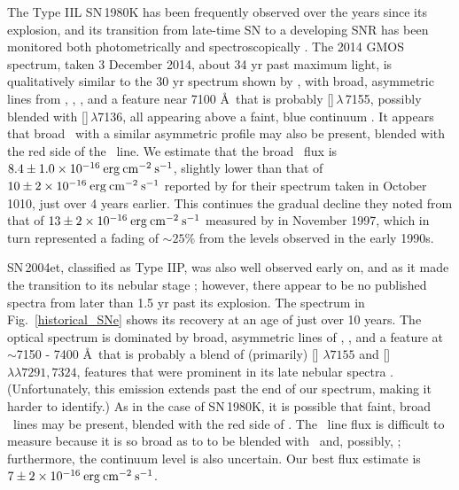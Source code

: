 The Type IIL SN\,1980K has been frequently observed over the years since its explosion, and its transition from late-time SN to a developing SNR has been monitored both photometrically and spectroscopically \citep[e.g.,][]{uomoto86, fesen90, fesen94, fesen99b, milisavljevic12}.  The 2014 GMOS spectrum, taken 3 December 2014, about  34 yr past maximum light, is qualitatively similar to the 30 yr spectrum shown by \citet{milisavljevic12}, with broad, asymmetric lines from \ha, \oi, \oiii, and a feature near 7100 \AA\ that is probably []\,$\lambda$\,7155, possibly blended with []\,$\lambda$7136, all appearing above a faint, blue continuum \citep[see][for a discussion of the 7100 \AA\ feature]{fesen94}.  It appears that broad \SiiL\ with a similar asymmetric profile may also be present, blended with the red side of the  \ha\ line.  We estimate that the broad \ha\ flux is $8.4 \pm 1.0 \times 10^{-16} \:{\rm erg\:cm^{-2}\:s^{-1}}$, slightly lower than that of $10 \pm 2 \times 10^{-16} \:{\rm erg\:cm^{-2}\:s^{-1}}$ reported by \citet{milisavljevic12} for their spectrum taken in October 1010, just over 4 years earlier.  This continues the gradual decline they noted from that of $13 \pm 2 \times 10^{-16} \:{\rm erg\:cm^{-2}\:s^{-1}}$ measured by \citet{fesen99b} in November 1997, which in turn represented a fading of $\sim 25\%$ from the levels observed in the early 1990s.

SN\,2004et, classified as Type IIP, was also well observed early on, and as it made the transition to its nebular stage \citep[e.g.,][]{sahu06, maguire10, jerkstrand12}; however, there appear to be no published spectra from later than 1.5 yr past its explosion.  The spectrum in Fig.~\ref{historical_SNe} shows its recovery at an age of just over 10 years.  The optical spectrum is dominated by broad, asymmetric lines of \ha, \oi, and a feature at $\sim$7150 - 7400 \AA\ that is probably a blend of (primarily)  [] $\lambda 7155$ and [] $\lambda\lambda 7291, 7324$, features that were prominent in its late nebular spectra \citep{sahu06, maguire10}.  (Unfortunately, this emission extends past the end of our spectrum, making it harder to identify.)  As in the case of SN\,1980K, it is possible that faint, broad \SiiL\ lines may be present, blended with the red side of \ha.  The \ha\ line flux is difficult to measure because it is so broad as to to be blended with \oi\ and, possibly, \sii; furthermore, the continuum level is also uncertain.  Our best flux estimate is $7 \pm 2 \times 10^{-16} \:{\rm erg\:cm^{-2}\:s^{-1}}$.


